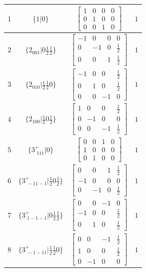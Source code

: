 \documentclass[fleqn,8pt]{jsarticle}
\begin{document}
\begin{longtable}{cccc}
$ 1 $ & $ \{1|0\} $ & $ \begin{bmatrix} 1 & 0 & 0 & 0 \\ 0 & 1 & 0 & 0 \\ 0 & 0 & 1 & 0 \end{bmatrix} $ & $ 1 $ \\ \hline
$ 2 $ & $ \{2{}_{001}|0 \frac{1}{2} \frac{1}{2}\} $ & $ \begin{bmatrix} -1 & 0 & 0 & 0 \\ 0 & -1 & 0 & \frac{1}{2} \\ 0 & 0 & 1 & \frac{1}{2} \end{bmatrix} $ & $ 1 $ \\ \hline
$ 3 $ & $ \{2{}_{010}|\frac{1}{2} \frac{1}{2} 0\} $ & $ \begin{bmatrix} -1 & 0 & 0 & \frac{1}{2} \\ 0 & 1 & 0 & \frac{1}{2} \\ 0 & 0 & -1 & 0 \end{bmatrix} $ & $ 1 $ \\ \hline
$ 4 $ & $ \{2{}_{100}|\frac{1}{2} 0 \frac{1}{2}\} $ & $ \begin{bmatrix} 1 & 0 & 0 & \frac{1}{2} \\ 0 & -1 & 0 & 0 \\ 0 & 0 & -1 & \frac{1}{2} \end{bmatrix} $ & $ 1 $ \\ \hline
$ 5 $ & $ \{3^{+}_{\,\,111}|0\} $ & $ \begin{bmatrix} 0 & 0 & 1 & 0 \\ 1 & 0 & 0 & 0 \\ 0 & 1 & 0 & 0 \end{bmatrix} $ & $ 1 $ \\ \hline
$ 6 $ & $ \{3^{+}_{\,\,-11-1}|\frac{1}{2} 0 \frac{1}{2}\} $ & $ \begin{bmatrix} 0 & 0 & 1 & \frac{1}{2} \\ -1 & 0 & 0 & 0 \\ 0 & -1 & 0 & \frac{1}{2} \end{bmatrix} $ & $ 1 $ \\ \hline
$ 7 $ & $ \{3^{+}_{\,\,1-1-1}|0 \frac{1}{2} \frac{1}{2}\} $ & $ \begin{bmatrix} 0 & 0 & -1 & 0 \\ -1 & 0 & 0 & \frac{1}{2} \\ 0 & 1 & 0 & \frac{1}{2} \end{bmatrix} $ & $ 1 $ \\ \hline
$ 8 $ & $ \{3^{+}_{\,\,-1-11}|\frac{1}{2} \frac{1}{2} 0\} $ & $ \begin{bmatrix} 0 & 0 & -1 & \frac{1}{2} \\ 1 & 0 & 0 & \frac{1}{2} \\ 0 & -1 & 0 & 0 \end{bmatrix} $ & $ 1 $ \\ \hline

\end{longtable}
\end{document}
